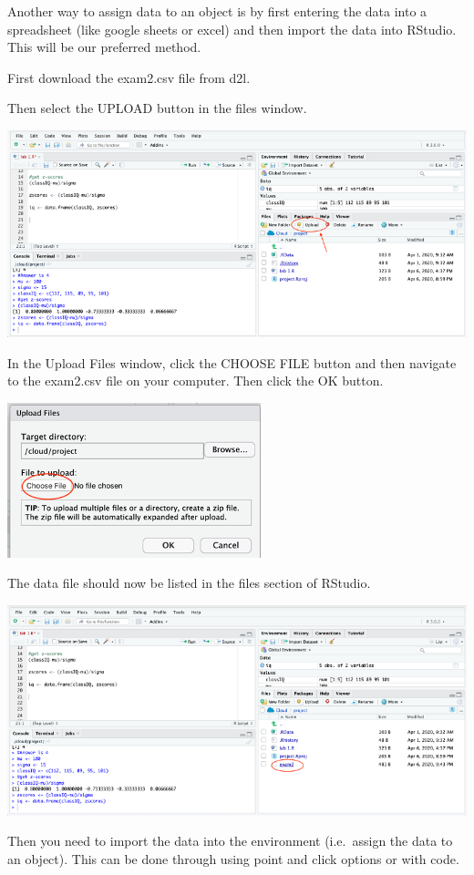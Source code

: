 \documentclass[
]{book}
\begin{document}
Another way to assign data to an object is by first entering the data into a spreadsheet (like google sheets or excel) and then import the data into RStudio. This will be our preferred method.

First download the exam2.csv file from d2l.

Then select the UPLOAD button in the files window.

\includegraphics{img/upload.png}

In the Upload Files window, click the CHOOSE FILE button and then navigate to the exam2.csv file on your computer. Then click the OK button.

\includegraphics{img/choosefile.png}

The data file should now be listed in the files section of RStudio.

\includegraphics{img/filelist.png}

Then you need to import the data into the environment (i.e.~assign the data to an object). This can be done through using point and click options or with code.
\end{document}
